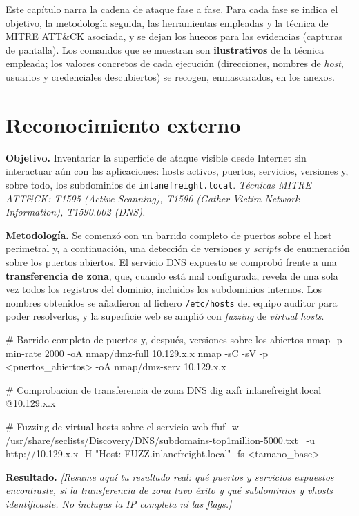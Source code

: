 \documentclass[11pt,a4paper,oneside]{report}
\newcommand{\guia}[1]{{\color{guia}\itshape[#1]}}
\begin{document}
Este capítulo narra la cadena de ataque fase a fase. Para cada fase se indica el objetivo, la metodología seguida, las herramientas empleadas y la técnica de MITRE ATT\&CK asociada, y se dejan los huecos para las evidencias (capturas de pantalla). Los comandos que se muestran son \textbf{ilustrativos} de la técnica empleada; los valores concretos de cada ejecución (direcciones, nombres de \emph{host}, usuarios y credenciales descubiertos) se recogen, enmascarados, en los anexos.

\section{Reconocimiento externo}
\label{sec:recon}

\textbf{Objetivo.} Inventariar la superficie de ataque visible desde Internet sin interactuar aún con las aplicaciones: hosts activos, puertos, servicios, versiones y, sobre todo, los subdominios de \texttt{inlanefreight.local}. \emph{Técnicas MITRE ATT\&CK: T1595 (Active Scanning), T1590 (Gather Victim Network Information), T1590.002 (DNS).}

\textbf{Metodología.} Se comenzó con un barrido completo de puertos sobre el host perimetral y, a continuación, una detección de versiones y \emph{scripts} de enumeración sobre los puertos abiertos. El servicio DNS expuesto se comprobó frente a una \textbf{transferencia de zona}, que, cuando está mal configurada, revela de una sola vez todos los registros del dominio, incluidos los subdominios internos. Los nombres obtenidos se añadieron al fichero \texttt{/etc/hosts} del equipo auditor para poder resolverlos, y la superficie web se amplió con \emph{fuzzing} de \emph{virtual hosts}.

\begin{consola}
# Barrido completo de puertos y, después, versiones sobre los abiertos
nmap -p- --min-rate 2000 -oA nmap/dmz-full 10.129.x.x
nmap -sC -sV -p <puertos_abiertos> -oA nmap/dmz-serv 10.129.x.x

# Comprobacion de transferencia de zona DNS
dig axfr inlanefreight.local @10.129.x.x

# Fuzzing de virtual hosts sobre el servicio web
ffuf -w /usr/share/seclists/Discovery/DNS/subdomains-top1million-5000.txt \
     -u http://10.129.x.x -H "Host: FUZZ.inlanefreight.local" -fs <tamano_base>
\end{consola}

\textbf{Resultado.} \guia{Resume aquí tu resultado real: qué puertos y servicios expuestos encontraste, si la transferencia de zona tuvo éxito y qué subdominios y vhosts identificaste. No incluyas la IP completa ni las flags.}
\end{document}
